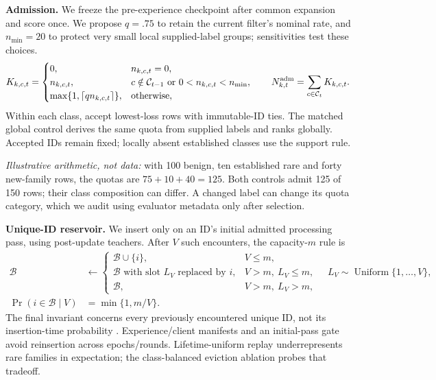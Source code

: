 \documentclass[10pt,a4paper]{article}
\begin{document}
\textbf{Admission.} We freeze the pre-experience checkpoint after common expansion and score once. We propose $q=.75$ to retain the current filter's nominal rate, and $n_{\min}=20$ to protect very small local supplied-label groups; sensitivities test these choices.
\begin{equation}
K_{k,c,t}=\begin{cases}
0,&n_{k,c,t}=0,\\
n_{k,c,t},&c\notin\mathcal C_{t-1}\ \text{or}\ 0<n_{k,c,t}<n_{\min},\\
\max\{1,\lceil qn_{k,c,t}\rceil\},&\text{otherwise},
\end{cases}\qquad N^{\rm adm}_{k,t}=\sum_{c\in\mathcal C_t}K_{k,c,t}.
\label{eq:quota}
\end{equation}
Within each class, accept lowest-loss rows with immutable-ID ties. The matched global control derives the same quota from supplied labels and ranks globally. Accepted IDs remain fixed; locally absent established classes use the support rule.

\emph{Illustrative arithmetic, not data:} with 100 benign, ten established rare and forty new-family rows, the quotas are $75+10+40=125$. Both controls admit 125 of 150 rows; their class composition can differ. A changed label can change its quota category, which we audit using evaluator metadata only after selection.

\textbf{Unique-ID reservoir.} We insert only on an ID's initial admitted processing pass, using post-update teachers. After $V$ such encounters, the capacity-$m$ rule is
\begin{equation}
\begin{aligned}
\mathcal B&\leftarrow\begin{cases}
\mathcal B\cup\{i\},&V\le m,\\
\mathcal B\text{ with slot }L_V\text{ replaced by }i,&V>m,\ L_V\le m,\\
\mathcal B,&V>m,\ L_V>m,
\end{cases}\quad L_V\sim\operatorname{Uniform}\{1,\ldots,V\},\\
\Pr(i\in\mathcal B\mid V)&=\min\{1,m/V\}.
\end{aligned}
\label{eq:reservoir}
\end{equation}
The final invariant concerns every previously encountered unique ID, not its insertion-time probability \cite{vitter}. Experience/client manifests and an initial-pass gate avoid reinsertion across epochs/rounds. Lifetime-uniform replay underrepresents rare families in expectation; the class-balanced eviction ablation probes that tradeoff.
\end{document}
